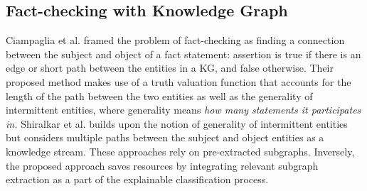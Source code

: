 \subsection{Fact-checking with Knowledge Graph}\label{sec:fc}
Ciampaglia et al. \cite{Ciampaglia2015} framed the problem of fact-checking as finding a connection between the subject and object of a fact statement: assertion is true if there is an edge or short path between the entities in a KG, and false otherwise. Their proposed method makes use of a truth valuation function that accounts for the length of the path between the two entities as well as the generality of intermittent entities, where generality means \textit{how many statements it participates in.}
Shiralkar et al. \cite{Shiralkar2017} builds upon the notion of generality of intermittent entities but considers multiple paths between the subject and object entities as a knowledge stream.
These approaches rely on pre-extracted subgraphs. Inversely, the proposed approach saves resources by integrating relevant subgraph extraction as a part of the explainable classification process.

